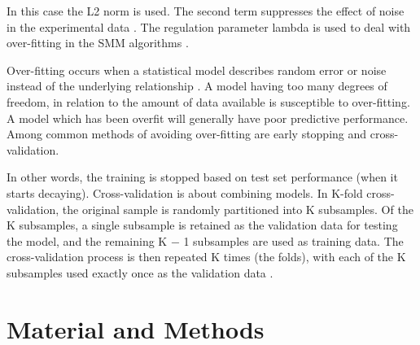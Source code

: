 \documentclass{bioinfo}
\begin{document}
\begin{application}
In this case the L2 norm is used. The second term suppresses the effect of noise in the experimental data \cite{SMM}. The regulation parameter lambda is used to deal with over-fitting in the SMM algorithms \cite{wiki:overfit}.
\par Over-fitting occurs when a statistical model describes random error or noise instead of the underlying relationship \cite{Hobohm}. A model having too many degrees of freedom, in relation to the amount of data available is susceptible to over-fitting. A model which has been overfit will generally have poor predictive performance. Among common methods of avoiding over-fitting are early stopping and cross-validation.
\par In other words, the training is stopped based on test set performance (when it starts decaying). Cross-validation is about combining models. In K-fold cross-validation, the original sample is randomly partitioned into K subsamples. Of the K subsamples, a single subsample is retained as the validation data for testing the model, and the remaining K − 1 subsamples are used as training data. The cross-validation process is then repeated K times (the folds), with each of the K subsamples used exactly once as the validation data \cite{wiki:crossval}.



\section*{Material and Methods}


\end{application}
\end{document}
